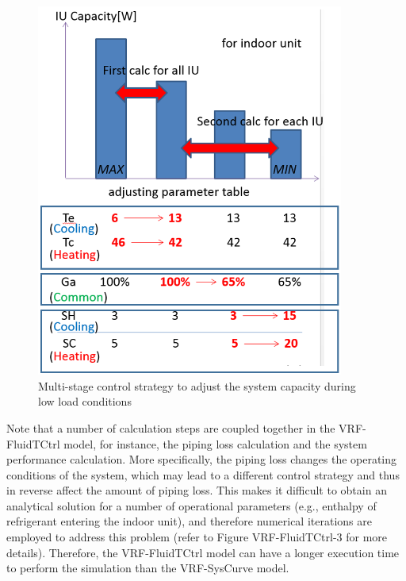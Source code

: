 \begin{figure}[hbtp] %
\centering
\includegraphics[width=0.9\textwidth, height=0.9\textheight, keepaspectratio=true]{media/VRF-FluidTCtrl-1a.png}
\caption{Multi-stage control strategy to adjust the system capacity during low load conditions \label{fig:multi-stage-control-strategy-to-adjust-the-system-capacity-during-low-load-conditions}}
\end{figure}

Note that a number of calculation steps are coupled together in the VRF-FluidTCtrl model, for instance, the piping loss calculation and the system performance calculation. More specifically, the piping loss changes the operating conditions of the system, which may lead to a different control strategy and thus in reverse affect the amount of piping loss. This makes it difficult to obtain an analytical solution for a number of operational parameters (e.g., enthalpy of refrigerant entering the indoor unit), and therefore numerical iterations are employed to address this problem (refer to Figure VRF-FluidTCtrl-3 for more details). Therefore, the VRF-FluidTCtrl model can have a longer execution time to perform the simulation than the VRF-SysCurve model. 

